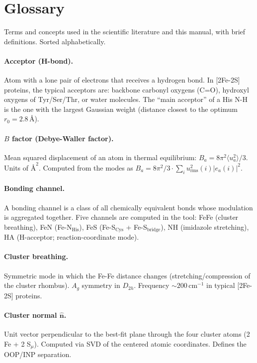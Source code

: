 \documentclass[11pt,a4paper,twoside]{article}
\providecommand{\angstrom}{\text{\AA}}    %
\theoremstyle{remark}
\begin{document}
\section{Glossary}
\label{app:glossary}

Terms and concepts used in the scientific literature and this
manual, with brief definitions. Sorted alphabetically.

\paragraph{Acceptor (H-bond).}
Atom with a lone pair of electrons that receives a hydrogen bond.
In [2Fe-2S] proteins, the typical acceptors are: backbone carbonyl
oxygens (C=O), hydroxyl oxygens of Tyr/Ser/Thr, or water
molecules. The ``main acceptor'' of a His N-H is the one with the
largest Gaussian weight (distance closest to the optimum
$r_0 = 2.8\,\angstrom$).

\paragraph{$B$ factor (Debye-Waller factor).}
Mean squared displacement of an atom in thermal equilibrium:
$B_a = 8\pi^2\langle u_a^2\rangle/3$. Units of $\angstrom^2$.
Computed from the modes as
$B_a = 8\pi^2/3 \cdot \sum_i u_\text{rms}^2(i) |e_a(i)|^2$.

\paragraph{Bonding channel.}
A bonding channel is a class of all chemically equivalent bonds
whose modulation is aggregated together. Five channels are
computed in the tool: FeFe (cluster breathing), FeN
(Fe-N$_\text{His}$), FeS
(Fe-S$_\text{Cys}$ + Fe-S$_\text{bridge}$), NH
(imidazole stretching), HA (H-acceptor;
reaction-coordinate mode).

\paragraph{Cluster breathing.}
Symmetric mode in which the Fe-Fe distance changes
(stretching/compression of the cluster rhombus). $A_g$ symmetry in
$D_{2h}$. Frequency $\sim 200$\,cm$^{-1}$ in typical [2Fe-2S]
proteins.

\paragraph{Cluster normal $\hat{\mathbf{n}}$.}
Unit vector perpendicular to the best-fit plane through the four
cluster atoms (2 Fe + 2 S$_\mu$). Computed via SVD of the centered
atomic coordinates. Defines the OOP/INP separation.
\end{document}
